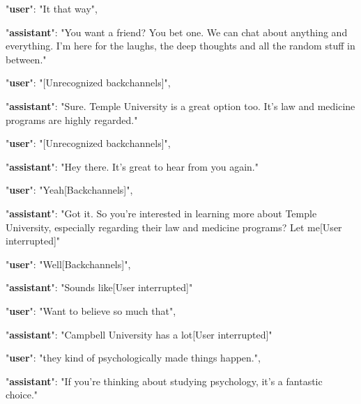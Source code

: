 \documentclass[11pt]{article}
\begin{document}
\begin{tcolorbox}[colback=yellow!10, colframe=red!80!black, title=VAD+GLM4-voice]

    "\textbf{user}": "It that way",
    
    "\textbf{assistant}": "You want a friend? You bet one. We can chat about anything and everything. I'm here for the laughs, the deep thoughts and all the random stuff in between."
    

    "\textbf{user}": "[Unrecognized backchannels]",
    
    "\textbf{assistant}": "Sure. Temple University is a great option too. It's law and medicine programs are highly regarded."

    "\textbf{user}": "[Unrecognized backchannels]",
    
    "\textbf{assistant}": "Hey there. It's great to hear from you again."

    "\textbf{user}": "Yeah[Backchannels]",
    
    "\textbf{assistant}": "Got it. So you're interested in learning more about Temple University, especially regarding their law and medicine programs? Let me[User interrupted]"
    
    "\textbf{user}": "Well[Backchannels]",
    
    "\textbf{assistant}": "Sounds like[User interrupted]"

    "\textbf{user}": "Want to believe so much that",
    
    "\textbf{assistant}": "Campbell University has a lot[User interrupted]"

    "\textbf{user}": "they kind of psychologically made things happen.",
    
    "\textbf{assistant}": "If you're thinking about studying psychology, it's a fantastic choice."

\end{tcolorbox}
\end{document}
